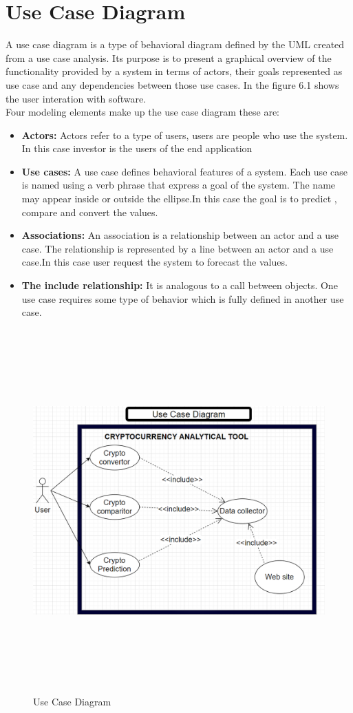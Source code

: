 \documentclass[openany,12pt]{report}
\begin{document}
\section{Use Case Diagram}
 A use case diagram is a type of behavioral diagram defined by the UML created from a use case analysis. Its purpose is to present a graphical overview of the functionality provided by a system in terms of actors, their goals represented as use case and any dependencies between those use cases.
 In the figure 6.1 shows the user interation with software.\\
Four modeling elements make up the use case diagram these are:\\
\begin{itemize}
\item{\textbf{Actors:} Actors refer to a type of users, users are people who use the system. In this case investor is the users of the  end application}
\item{\textbf{Use cases:} A use case defines behavioral features of a system. Each use case is named using a verb phrase that express a goal of the system. The name may appear inside or outside the ellipse.In this case the goal is to predict , compare and convert the values.}
\item{\textbf{Associations:} An association is a relationship between an actor and a use case. The relationship is represented by a line between an actor and a use case.In this case user request the system to forecast the values.}

\item{\textbf{The include relationship:} It is analogous to a call between objects. One use case requires some type of behavior which is fully defined in  another use case.}
\end{itemize}
\begin{figure}[H]
\centering
\includegraphics[width=5in,height=5.5in]{./Use case diagram.png}
\caption{Use Case Diagram}
\end{figure}
\end{document}
